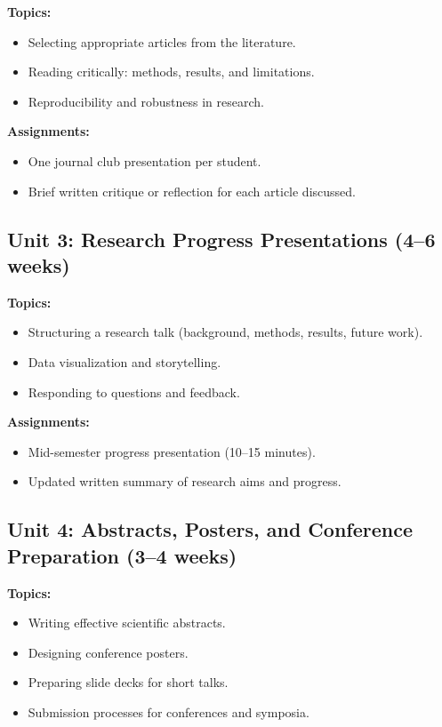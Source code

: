 \documentclass[12pt,oneside]{book}
\begin{document}
\textbf{Topics:}
\begin{itemize}
    \item Selecting appropriate articles from the literature.
    \item Reading critically: methods, results, and limitations.
    \item Reproducibility and robustness in research.
\end{itemize}

\textbf{Assignments:}
\begin{itemize}
    \item One journal club presentation per student.
    \item Brief written critique or reflection for each article discussed.
\end{itemize}

\subsection{Unit 3: Research Progress Presentations (4--6 weeks)}

\textbf{Topics:}
\begin{itemize}
    \item Structuring a research talk (background, methods, results, future work).
    \item Data visualization and storytelling.
    \item Responding to questions and feedback.
\end{itemize}

\textbf{Assignments:}
\begin{itemize}
    \item Mid-semester progress presentation (10–15 minutes).
    \item Updated written summary of research aims and progress.
\end{itemize}

\subsection{Unit 4: Abstracts, Posters, and Conference Preparation (3--4 weeks)}

\textbf{Topics:}
\begin{itemize}
    \item Writing effective scientific abstracts.
    \item Designing conference posters.
    \item Preparing slide decks for short talks.
    \item Submission processes for conferences and symposia.
\end{itemize}
\end{document}
